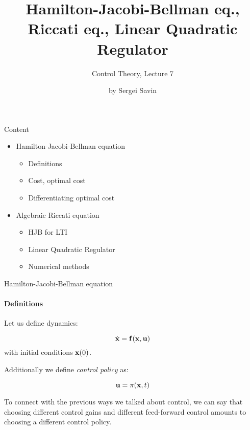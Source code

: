 \documentclass{beamer}
\title{Hamilton-Jacobi-Bellman eq., Riccati eq., Linear Quadratic Regulator}
\subtitle{Control Theory, Lecture 7}
\author{by Sergei Savin}
\date{\mydate}
\begin{document}
\maketitle


\begin{frame}{Content}
\begin{itemize}
\item Hamilton-Jacobi-Bellman equation
\begin{itemize}
    \item Definitions
    \item Cost, optimal cost
    \item Differentiating optimal cost
\end{itemize}
\item Algebraic Riccati equation
\begin{itemize}
    \item HJB for LTI
    \item Linear Quadratic Regulator
    \item Numerical methods
\end{itemize}
\end{itemize}
\end{frame}

\begin{frame}{Hamilton-Jacobi-Bellman equation}
\framesubtitle{Definitions}
\begin{flushleft}

Let us define dynamics:

\begin{equation}
    \dot {\mathbf{x}} = \mathbf{f} (\mathbf{x}, \mathbf{u})
\end{equation}
%
with initial conditions $\mathbf{x}(0)$. 

\bigskip

Additionally we define \emph{control policy} as:

\begin{equation}
    \mathbf{u} = \pi (\mathbf{x}, t)
\end{equation}

To connect with the previous ways we talked about control, we can say that choosing different control gains and different feed-forward control amounts to choosing a different control policy.

\end{flushleft}
\end{frame}
\end{document}
